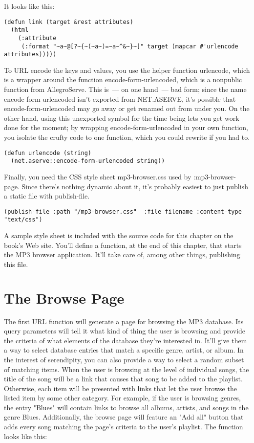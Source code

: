 It looks like this:

\begin{lstlisting}
(defun link (target &rest attributes)
  (html 
    (:attribute
     (:format "~a~@[?~{~(~a~)=~a~^&~}~]" target (mapcar #'urlencode attributes)))))
\end{lstlisting}

To URL encode the keys and values, you use the helper function urlencode, which is a
wrapper around the function encode-form-urlencoded, which is a nonpublic function from
AllegroServe. This is~--- on one hand~--- bad form; since the name encode-form-urlencoded isn't
exported from NET.ASERVE, it's possible that encode-form-urlencoded may go away or get
renamed out from under you. On the other hand, using this unexported symbol for the time
being lets you get work done for the moment; by wrapping encode-form-urlencoded in your
own function, you isolate the crufty code to one function, which you could rewrite if you
had to.

\begin{lstlisting}
(defun urlencode (string)
  (net.aserve::encode-form-urlencoded string))
\end{lstlisting}

Finally, you need the CSS style sheet mp3-browser.css used by :mp3-browser-page. Since
there's nothing dynamic about it, it's probably easiest to just publish a static file with
publish-file.

\begin{lstlisting}
(publish-file :path "/mp3-browser.css"  :file filename :content-type "text/css")
\end{lstlisting}

A sample style sheet is included with the source code for this chapter on the book's Web
site. You'll define a function, at the end of this chapter, that starts the MP3 browser
application. It'll take care of, among other things, publishing this file.

\section{The Browse Page}

The first URL function will generate a page for browsing the MP3 database. Its query
parameters will tell it what kind of thing the user is browsing and provide the criteria
of what elements of the database they're interested in. It'll give them a way to select
database entries that match a specific genre, artist, or album. In the interest of
serendipity, you can also provide a way to select a random subset of matching items. When
the user is browsing at the level of individual songs, the title of the song will be a
link that causes that song to be added to the playlist. Otherwise, each item will be
presented with links that let the user browse the listed item by some other category. For
example, if the user is browsing genres, the entry "Blues" will contain links to browse
all albums, artists, and songs in the genre Blues. Additionally, the browse page will
feature an "Add all" button that adds every song matching the page's criteria to the
user's playlist. The function looks like this:

